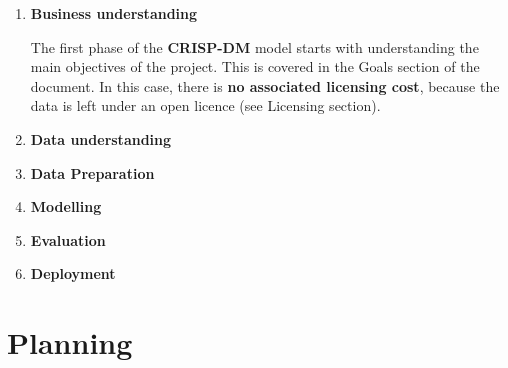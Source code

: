 \begin{enumerate}
    \item \textbf{Business understanding}
    
    The first phase of the \textbf{CRISP-DM} model starts with understanding the main objectives of the project. This is covered in the Goals section of the document. In this case, there is \textbf{no associated licensing cost}, because the data is left under an open licence (see Licensing section).
    \item \textbf{Data understanding}
    \item \textbf{Data Preparation}
    \item \textbf{Modelling}
    \item \textbf{Evaluation}
    \item \textbf{Deployment}
\end{enumerate}


\section{Planning}


